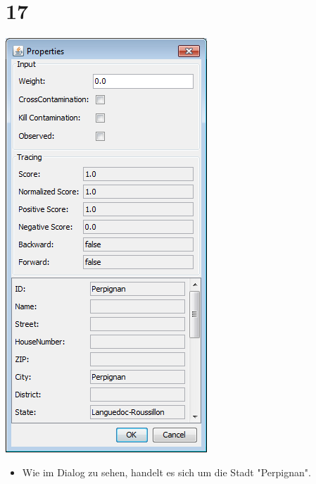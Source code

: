 \documentclass{beamer}
\begin{document}
\section{17}
\begin{frame}
	\begin{center}
  		\includegraphics[height=0.6\textheight]{17.png}
	\end{center}
	\begin{itemize}		
		\item Wie im Dialog zu sehen, handelt es sich um die Stadt "Perpignan".
	\end{itemize}
\end{frame}
\end{document}
